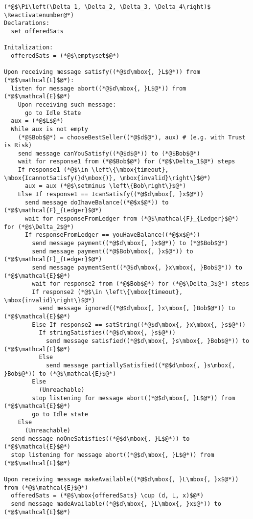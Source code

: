 \Suppressnumber
\begin{lstlisting}[label=protocol, style=numbers]
(*@$\Pi\left(\Delta_1, \Delta_2, \Delta_3, \Delta_4\right)$ \Reactivatenumber@*)
Declarations:
  set offeredSats

Initalization:
  offeredSats = (*@$\emptyset$@*)

Upon receiving message satisfy((*@$d\mbox{, }L$@*)) from (*@$\mathcal{E}$@*):
  listen for message abort((*@$d\mbox{, }L$@*)) from (*@$\mathcal{E}$@*)
    Upon receiving such message:
      go to Idle State
  aux = (*@$L$@*)
  While aux is not empty
    (*@$Bob$@*) = chooseBestSeller((*@$d$@*), aux) # (e.g. with Trust is Risk)
    send message canYouSatisfy((*@$d$@*)) to (*@$Bob$@*)
    wait for response1 from (*@$Bob$@*) for (*@$\Delta_1$@*) steps
    If response1 (*@$\in \left\{\mbox{timeout}, \mbox{IcannotSatisfy(}d\mbox{)}, \mbox{invalid}\right\}$@*)
      aux = aux (*@$\setminus \left\{Bob\right\}$@*)
    Else If response1 == IcanSatisfy((*@$d\mbox{, }x$@*))
      send message doIhaveBalance((*@$x$@*)) to (*@$\mathcal{F}_{Ledger}$@*)
      wait for responseFromLedger from (*@$\mathcal{F}_{Ledger}$@*) for (*@$\Delta_2$@*)
      If responseFromLedger == youHaveBalance((*@$x$@*))
        send message payment((*@$d\mbox{, }x$@*)) to (*@$Bob$@*)
        send message payment((*@$Bob\mbox{, }x$@*)) to (*@$\mathcal{F}_{Ledger}$@*)
        send message paymentSent((*@$d\mbox{, }x\mbox{, }Bob$@*)) to (*@$\mathcal{E}$@*)
        wait for response2 from (*@$Bob$@*) for (*@$\Delta_3$@*) steps
        If response2 (*@$\in \left\{\mbox{timeout}, \mbox{invalid}\right\}$@*)
          send message ignored((*@$d\mbox{, }x\mbox{, }Bob$@*)) to (*@$\mathcal{E}$@*)
        Else If response2 == satString((*@$d\mbox{, }x\mbox{, }s$@*))
          If stringSatisfies((*@$d\mbox{, }s$@*))
            send message satisfied((*@$d\mbox{, }s\mbox{, }Bob$@*)) to (*@$\mathcal{E}$@*)
          Else
            send message partiallySatisfied((*@$d\mbox{, }s\mbox{, }Bob$@*)) to (*@$\mathcal{E}$@*)
        Else
          (Unreachable)
        stop listening for message abort((*@$d\mbox{, }L$@*)) from (*@$\mathcal{E}$@*)
        go to Idle state
    Else
      (Unreachable)
  send message noOneSatisfies((*@$d\mbox{, }L$@*)) to (*@$\mathcal{E}$@*)
  stop listening for message abort((*@$d\mbox{, }L$@*)) from (*@$\mathcal{E}$@*)

Upon receiving message makeAvailable((*@$d\mbox{, }L\mbox{, }x$@*)) from (*@$\mathcal{E}$@*)
  offeredSats = (*@$\mbox{offeredSats} \cup (d, L, x)$@*)
  send message madeAvailable((*@$d\mbox{, }L\mbox{, }x$@*)) to (*@$\mathcal{E}$@*)


\end{lstlisting}
